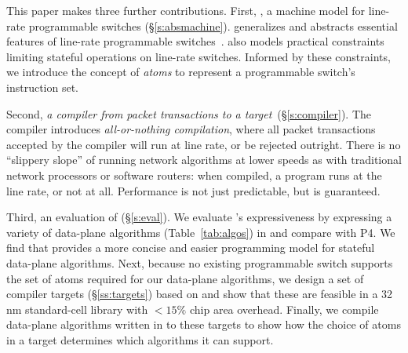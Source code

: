 This paper makes three further contributions. First, {\em
  \absmachine}, a machine model for line-rate programmable switches
(\S\ref{s:absmachine}). \absmachine generalizes and abstracts
essential features of line-rate programmable switches~\cite{rmt,
  xpliant, flexpipe}. \absmachine also models practical constraints
limiting stateful operations on line-rate switches.  Informed by these
constraints, we introduce the concept of {\em atoms} to represent a
programmable switch's instruction set.

Second, {\em a compiler from \pktlanguage packet transactions to a
  \absmachine target}~(\S\ref{s:compiler}). The \pktlanguage compiler
introduces \textit{all-or-nothing compilation}, where all packet
transactions accepted by the compiler will run at line rate, or be
rejected outright. There is no ``slippery slope'' of running network
algorithms at lower speeds as with traditional network processors or
software routers: when compiled, a \pktlanguage program runs at the
line rate, or not at all. Performance is not just predictable, but
is guaranteed.

Third, an evaluation of \pktlanguage (\S\ref{s:eval}). We evaluate
\pktlanguage's expressiveness by expressing a variety of data-plane
algorithms (Table~\ref{tab:algos}) in \pktlanguage and compare with
P4. We find that \pktlanguage provides a more concise and easier
programming model for stateful data-plane algorithms.  Next, because
no existing programmable switch supports the set of atoms required for
our data-plane algorithms, we design a set of compiler targets
(\S\ref{ss:targets}) based on \absmachine and show that these are
feasible in a 32 nm standard-cell library with $< 15\%$ chip area
overhead.  Finally, we compile data-plane algorithms written in
\pktlanguage to these targets to show how the choice of atoms in a
target determines which algorithms it can support.
